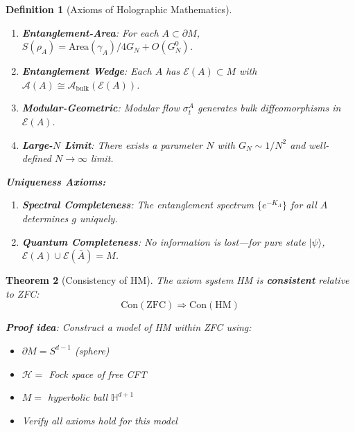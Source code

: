 \documentclass[12pt,a4paper]{article}
\newtheorem{theorem}{Theorem}[section]
\newtheorem{definition}[theorem]{Definition}
\begin{document}
\begin{definition}[Axioms of Holographic Mathematics]
\begin{enumerate}
    \item[\textbf{HM6.}] \textbf{Entanglement-Area}: For each $A \subset \partial M$, $S(\rho_A) = \text{Area}(\gamma_A)/4G_N + O(G_N^0)$.
    
    \item[\textbf{HM7.}] \textbf{Entanglement Wedge}: Each $A$ has $\mathcal{E}(A) \subset M$ with $\mathcal{A}(A) \cong \mathcal{A}_{\text{bulk}}(\mathcal{E}(A))$.
    
    \item[\textbf{HM8.}] \textbf{Modular-Geometric}: Modular flow $\sigma_t^A$ generates bulk diffeomorphisms in $\mathcal{E}(A)$.
    
    \item[\textbf{HM9.}] \textbf{Large-$N$ Limit}: There exists a parameter $N$ with $G_N \sim 1/N^2$ and well-defined $N \to \infty$ limit.
\end{enumerate}

\textbf{Uniqueness Axioms:}
\begin{enumerate}
    \item[\textbf{HM10.}] \textbf{Spectral Completeness}: The entanglement spectrum $\{e^{-K_A}\}$ for all $A$ determines $g$ uniquely.
    
    \item[\textbf{HM11.}] \textbf{Quantum Completeness}: No information is lost---for pure state $|\psi\rangle$, $\mathcal{E}(A) \cup \mathcal{E}(\bar{A}) = M$.
\end{enumerate}
\end{definition}

\begin{theorem}[Consistency of HM]\label{thm:hm-consistency}
The axiom system HM is \textbf{consistent} relative to ZFC:
\begin{equation}
\text{Con}(\text{ZFC}) \Rightarrow \text{Con}(\text{HM})
\end{equation}

\textbf{Proof idea}: Construct a model of HM within ZFC using:
\begin{itemize}
    \item $\partial M = S^{d-1}$ (sphere)
    \item $\mathcal{H} = $ Fock space of free CFT
    \item $M = $ hyperbolic ball $\mathbb{H}^{d+1}$
    \item Verify all axioms hold for this model
\end{itemize}
\end{theorem}
\end{document}
